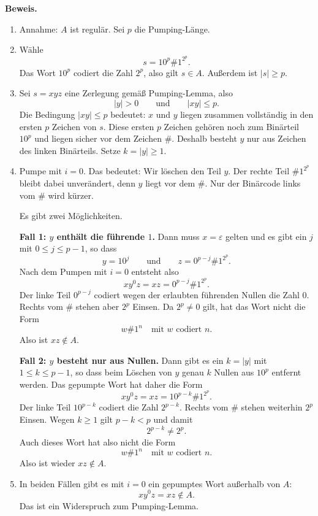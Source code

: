 \documentclass[a4paper,12pt]{article}
\begin{document}
\medskip
\textbf{Beweis.}
\begin{enumerate}
    \item Annahme: $A$ ist regulär. Sei $p$ die Pumping-Länge.

    \item Wähle
    \[
        s=10^p\#1^{2^p}.
    \]
    Das Wort $10^p$ codiert die Zahl $2^p$, also gilt $s\in A$.
    Außerdem ist $|s|\ge p$.

    \item Sei $s=xyz$ eine Zerlegung gemäß Pumping-Lemma, also
    \[
        |y|>0
        \qquad\text{und}\qquad
        |xy|\le p.
    \]
    Die Bedingung $|xy|\le p$ bedeutet: $x$ und $y$ liegen zusammen vollständig in den ersten $p$ Zeichen von $s$.
    Diese ersten $p$ Zeichen gehören noch zum Binärteil $10^p$ und liegen sicher vor dem Zeichen $\#$.
    Deshalb besteht $y$ nur aus Zeichen des linken Binärteils.
    Setze $k=|y|\ge 1$.

    \item Pumpe mit $i=0$. Das bedeutet: Wir löschen den Teil $y$.
    Der rechte Teil $\#1^{2^p}$ bleibt dabei unverändert, denn $y$ liegt vor dem $\#$.
    Nur der Binärcode links vom $\#$ wird kürzer.

    Es gibt zwei Möglichkeiten.

    \medskip
    \textbf{Fall 1: $y$ enthält die führende $1$.}
    Dann muss $x=\varepsilon$ gelten und es gibt ein $j$ mit $0\le j\le p-1$, so dass
    \[
        y=10^j
        \qquad\text{und}\qquad
        z=0^{p-j}\#1^{2^p}.
    \]
    Nach dem Pumpen mit $i=0$ entsteht also
    \[
        xy^0z=xz=0^{p-j}\#1^{2^p}.
    \]
    Der linke Teil $0^{p-j}$ codiert wegen der erlaubten führenden Nullen die Zahl $0$.
    Rechts vom $\#$ stehen aber $2^p$ Einsen. Da $2^p\ne 0$ gilt, hat das Wort nicht die Form
    \[
        w\#1^n
        \quad\text{mit $w$ codiert $n$}.
    \]
    Also ist $xz\notin A$.

    \medskip
    \textbf{Fall 2: $y$ besteht nur aus Nullen.}
    Dann gibt es ein $k=|y|$ mit $1\le k\le p-1$, so dass beim Löschen von $y$ genau $k$ Nullen aus $10^p$ entfernt werden.
    Das gepumpte Wort hat daher die Form
    \[
        xy^0z=xz=10^{p-k}\#1^{2^p}.
    \]
    Der linke Teil $10^{p-k}$ codiert die Zahl $2^{p-k}$.
    Rechts vom $\#$ stehen weiterhin $2^p$ Einsen.
    Wegen $k\ge 1$ gilt $p-k<p$ und damit
    \[
        2^{p-k}\ne 2^p.
    \]
    Auch dieses Wort hat also nicht die Form
    \[
        w\#1^n
        \quad\text{mit $w$ codiert $n$}.
    \]
    Also ist wieder $xz\notin A$.

    \item In beiden Fällen gibt es mit $i=0$ ein gepumptes Wort außerhalb von $A$:
    \[
        xy^0z=xz\notin A.
    \]
    Das ist ein Widerspruch zum Pumping-Lemma.
\end{enumerate}
\end{document}
